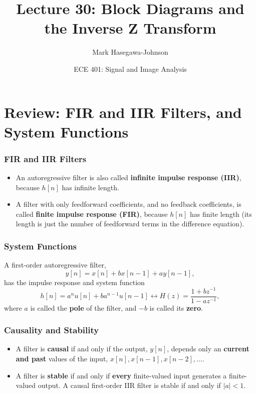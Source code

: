 \documentclass{beamer}
\title{Lecture 30: Block Diagrams and the Inverse Z Transform}
\author{Mark Hasegawa-Johnson}
\date{ECE 401: Signal and Image Analysis}
\begin{document}
\begin{frame}
  \maketitle
\end{frame}

\begin{frame}
  \tableofcontents
\end{frame}

\section[Review]{Review: FIR and IIR Filters, and System Functions}
\setcounter{subsection}{1}

\begin{frame}
  \frametitle{FIR and IIR Filters}
  \begin{itemize}
  \item An autoregressive filter is also called {\bf infinite impulse response (IIR)},
    because $h[n]$ has infinite length.
  \item A filter with only feedforward coefficients, and no feedback coefficients, is called
    {\bf finite impulse response (FIR)}, because $h[n]$ has finite length (its length is
    just the number of feedforward terms in the difference equation).
  \end{itemize}
\end{frame}

\begin{frame}
  \frametitle{System Functions}
  A first-order autoregressive filter,
  \[
  y[n] = x[n]+bx[n-1]+ay[n-1],
  \]
  has the impulse response and system function
  \[
  h[n]=a^n u[n]+ba^{n-1}u[n-1] \leftrightarrow H(z)  = \frac{1+bz^{-1}}{1-az^{-1}},
  \]
  where $a$ is called the {\bf pole} of the filter, and $-b$ is called
  its {\bf zero}.
\end{frame}

\begin{frame}
  \frametitle{Causality and Stability}
  \begin{itemize}
  \item A filter is {\bf causal} if and only if the output, $y[n]$,
    depends only an {\bf current and past} values of the input, $x[n],
    x[n-1],x[n-2],\ldots$.
  \item A filter is {\bf stable} if and only if {\bf every}
    finite-valued input generates a finite-valued output.  A causal
    first-order IIR filter is stable if and only if $|a|<1$.
  \end{itemize}
\end{frame}
\end{document}
